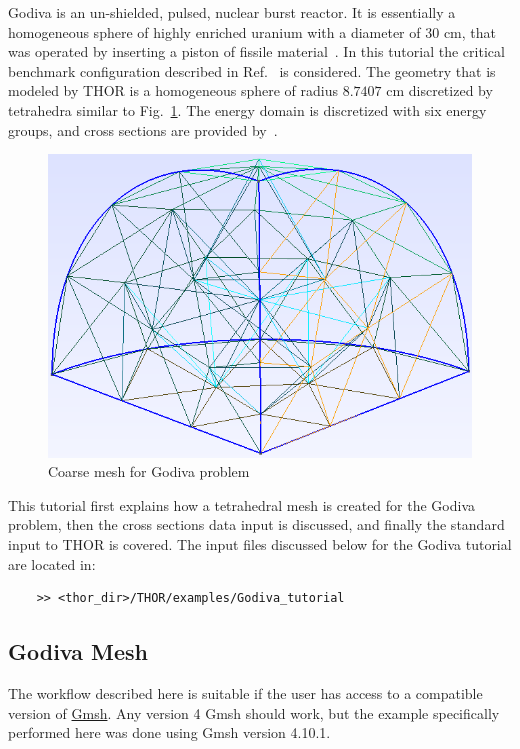 Godiva is an un-shielded, pulsed, nuclear burst reactor. It is essentially a homogeneous sphere of highly enriched uranium with a diameter of $30$ cm, that was operated by inserting a piston of fissile material~\cite{Godiva1961}.
In this tutorial the critical benchmark configuration described in Ref.~\cite{GodivaBenchmark} is considered. The geometry that is modeled by \ac{THOR} is a homogeneous sphere of radius $8.7407$ cm discretized by tetrahedra similar to Fig.~\ref{fig:godiva_coarse}.
The energy domain is discretized with six energy groups, and cross sections are provided by~\cite{GodivaBenchmark}.

\begin{figure}[th]
  \includegraphics[width=1.0\textwidth]{chapters/tutorials/figures/godiva_coarse.png}
  \caption{Coarse mesh for Godiva problem}
  \label{fig:godiva_coarse}
\end{figure}

This tutorial first explains how a tetrahedral mesh is created for the Godiva problem, then the cross sections data input is discussed, and finally the standard input to \ac{THOR} is covered.
The input files discussed below for the Godiva tutorial are located in:
\begin{verbatim}
    >> <thor_dir>/THOR/examples/Godiva_tutorial
\end{verbatim}

\subsection{Godiva Mesh}\label{ch:tuts:sec:godiva:ssec:mesh}

The workflow described here is suitable if the user has access to a compatible version of \href{https://gmsh.info/}{Gmsh}.
Any version 4 Gmsh should work, but the example specifically performed here was done using Gmsh version 4.10.1.

